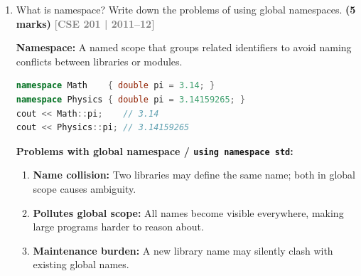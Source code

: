 \documentclass[12pt,a3paper]{article}
\newcommand{\yr}[1]{\hfill\textcolor{gray}{\small\textbf{[#1]}}}
\newcommand{\mk}[1]{\textcolor{orange!70!black}{\small\textbf{(#1 marks)}}}
\begin{document}
\begin{enumerate}
\begin{tcolorbox}[enhanced,breakable,ansbox,colback=cC!4,colframe=cC,
  boxrule=0.8pt,arc=5pt,
  title={\textbf{Answer --- Default argument causes constructor overloading ambiguity}},
  fonttitle=\bfseries\color{white},colbacktitle=cC]

\begin{lstlisting}[language=C++]
class Point {
public:
    Point() {
        cout << "Default constructor\n";
    }
    Point(int x = 0, int y = 0) {
        cout << "Parameterised: " << x << "," << y << "\n";
    }
};

int main() {
    Point p;   // ERROR: ambiguous!
               // Both Point() and Point(int=0, int=0)
               // match a no-argument call.
}
\end{lstlisting}

\textbf{Explanation:} Both constructors can be called with no
arguments.  The compiler sees two equally valid matches and reports
an ambiguity error.  \textbf{Fix:} remove one of the constructors
or remove the defaults from \texttt{Point(int, int)}.

\end{tcolorbox}

\item What is namespace? Write down the problems of using global namespaces. \mk{5}
\yr{CSE 201 | 2011--12}
\begin{tcolorbox}[enhanced,breakable,ansbox,colback=cC!4,colframe=cC,
  boxrule=0.8pt,arc=5pt,
  title={\textbf{Answer --- Namespace and global namespace problems}},
  fonttitle=\bfseries\color{white},colbacktitle=cC]

\textbf{Namespace:} A named scope that groups related identifiers
to avoid naming conflicts between libraries or modules.

\begin{lstlisting}[language=C++]
namespace Math    { double pi = 3.14; }
namespace Physics { double pi = 3.14159265; }
cout << Math::pi;    // 3.14
cout << Physics::pi; // 3.14159265
\end{lstlisting}

\textbf{Problems with global namespace / \texttt{using namespace std}:}
\begin{enumerate}[label=\textbf{\arabic*.}]
  \item \textbf{Name collision:} Two libraries may define the same
    name; both in global scope causes ambiguity.
  \item \textbf{Pollutes global scope:} All names become visible
    everywhere, making large programs harder to reason about.
  \item \textbf{Maintenance burden:} A new library name may
    silently clash with existing global names.
\end{enumerate}


\end{tcolorbox}
\end{enumerate}
\end{document}
